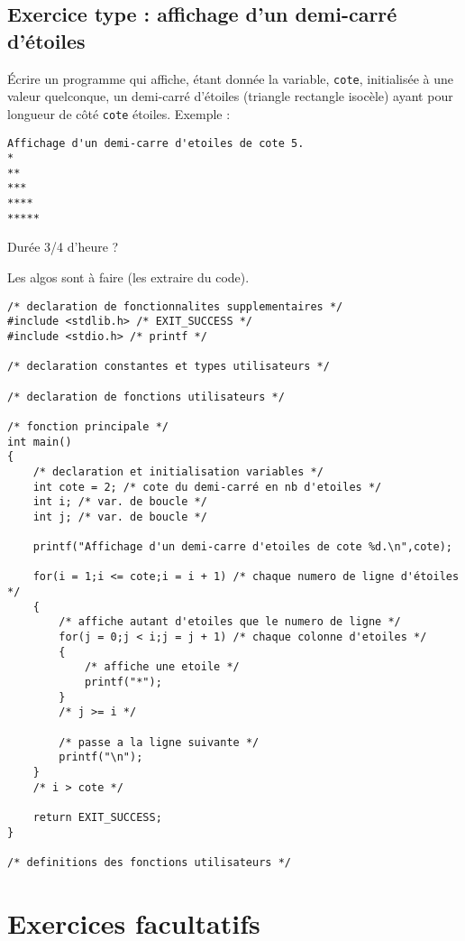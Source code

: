 \subsection{Exercice type : affichage d'un demi-carré d'étoiles}

Écrire un programme  qui affiche, étant donnée la variable,
\verb|cote|, initialisée à une valeur quelconque, un demi-carré d'étoiles (triangle rectangle isocèle) ayant pour
longueur de côté \verb|cote| étoiles. Exemple :
\begin{verbatim}
Affichage d'un demi-carre d'etoiles de cote 5.
*
**
***
****
*****
\end{verbatim}

\begin{correction}
Durée 3/4 d'heure ?

Les algos sont à faire (les extraire du code).

\begin{verbatim}
/* declaration de fonctionnalites supplementaires */
#include <stdlib.h> /* EXIT_SUCCESS */
#include <stdio.h> /* printf */

/* declaration constantes et types utilisateurs */

/* declaration de fonctions utilisateurs */

/* fonction principale */
int main()
{
    /* declaration et initialisation variables */
    int cote = 2; /* cote du demi-carré en nb d'etoiles */
    int i; /* var. de boucle */
    int j; /* var. de boucle */

    printf("Affichage d'un demi-carre d'etoiles de cote %d.\n",cote);

    for(i = 1;i <= cote;i = i + 1) /* chaque numero de ligne d'étoiles */
    {
        /* affiche autant d'etoiles que le numero de ligne */
        for(j = 0;j < i;j = j + 1) /* chaque colonne d'etoiles */
        {
            /* affiche une etoile */
            printf("*");
        }
        /* j >= i */

        /* passe a la ligne suivante */
        printf("\n");
    }
    /* i > cote */

    return EXIT_SUCCESS;
}

/* definitions des fonctions utilisateurs */
\end{verbatim}
\end{correction}

\section{Exercices facultatifs}

